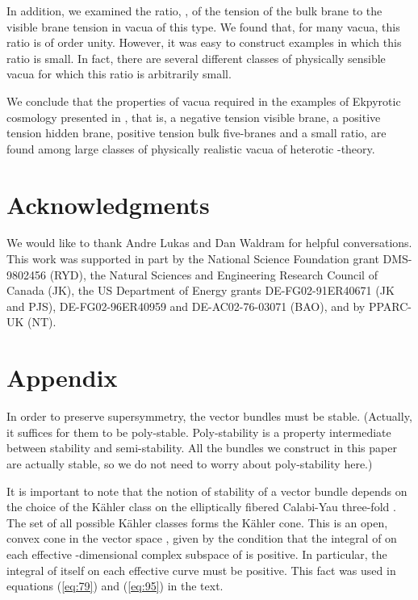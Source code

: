 \documentclass[a4paper,12pt]{article}
\numberwithin{equation}{section}
\theoremstyle{plain}
\begin{document}
In addition, we examined the ratio, \coordHE{}, of the tension of
the bulk brane to the visible brane tension in vacua of this type. 
We found that, for many vacua, this
ratio is of order unity. However, it was easy to construct examples in
which this ratio is small. In fact, there are several different classes of
physically sensible vacua for which this ratio is arbitrarily small.

We conclude that the properties of vacua required in the examples
of Ekpyrotic cosmology presented in \cite{EU}, that is, a negative tension 
visible brane, a positive tension hidden brane, positive tension bulk five-branes
and a small \coordHE{} ratio, are found among large classes of physically
realistic vacua of heterotic \coordHE{}-theory.


\bigskip
\bigskip
\section*{Acknowledgments}
We would like to thank Andre Lukas and Dan Waldram for helpful conversations.
This work was supported in part by the National Science Foundation grant
DMS-9802456 (RYD), the Natural Sciences and 
Engineering Research Council of Canada (JK),
the US Department of Energy grants DE-FG02-91ER40671 (JK and PJS), 
DE-FG02-96ER40959 and DE-AC02-76-03071 (BAO), and by PPARC-UK (NT). 
\bigskip
    

\section*{Appendix}

In order to preserve \coordHE{} supersymmetry, the vector bundles
\coordHE{} must be stable. (Actually, it suffices for them to be
poly-stable. Poly-stability is a property intermediate between stability
and semi-stability. All the bundles we construct in this paper
are actually stable, so we do not need to worry about poly-stability here.)

It is important to note that the notion of stability of a vector bundle
\coordHE{} depends on the choice of the K\"{a}hler class \myHighlight{$\omega$}\coordHE{} on the elliptically
fibered Calabi-Yau
three-fold \coordHE{}. The set of all possible K\"{a}hler classes forms the K\"{a}hler cone. 
This is an open, convex cone in the vector space \coordHE{}, 
given by the condition that the integral of \coordHE{} on each effective 
\coordHE{}-dimensional complex subspace of \coordHE{} is positive. In particular, 
the integral of \myHighlight{$\omega$}\coordHE{} itself on each effective curve must be positive. This
fact was used in equations (\ref{eq:79}) and (\ref{eq:95}) in the text. 
\end{document}
